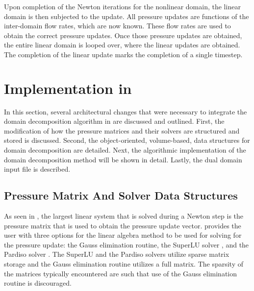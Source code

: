 Upon completion of the Newton iterations for the nonlinear domain, the linear domain is then subjected to the update.
All pressure updates are functions of the inter-domain flow rates, which are now known.
These flow rates are used to obtain the correct pressure updates.
Once those pressure updates are obtained, the entire linear domain is looped over, where the linear updates are obtained.
The completion of the linear update marks the completion of a single timestep.

\section{Implementation in \cobra{}}
\label{sec:dd_algo}

In this section, several architectural changes that were necessary to integrate the domain decomposition algorithm in  are discussed and outlined.
First, the modification of how the pressure matrices and their solvers are structured and stored is discussed.
Second, the object-oriented, volume-based, data structures for domain decomposition are detailed.
Next, the algorithmic implementation of the domain decomposition method will be shown in detail.
Lastly, the dual domain input file is described.

\subsection{Pressure Matrix And Solver Data Structures}
\label{subsect:domDecompSolverStructs}

As seen in , the largest linear system that is solved during a Newton step is the pressure matrix that is used to obtain the pressure update vector.
\cobra{} provides the user with three options for the linear algebra method to be used for solving for the pressure update: the Gauss elimination routine, the SuperLU solver \cite{Li1999}, and the Pardiso solver \cite{Schenk2006, Schenk2007}.
The SuperLU and the Pardiso solvers utilize sparse matrix storage and the Gauss elimination routine utilizes a full matrix.
The sparsity of the matrices typically encountered are such that use of the Gauss elimination routine is discouraged.


